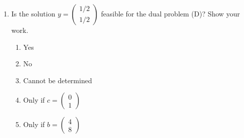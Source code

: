 \documentclass{article}%
\begin{document}
\begin{enumerate}
\begin{enumerate}
\vspace{0.5em}%
\item Is the solution $y = \begin{pmatrix} 1/2 \\ 1/2 \end{pmatrix}$ feasible for the dual problem (D)? Show your work.%
\begin{enumerate}%
\item Yes%
\item No%
\item Cannot be determined%
\item Only if $c = \begin{pmatrix} 0 \\ 1 \end{pmatrix}$%
\item Only if $b = \begin{pmatrix} 4 \\ 8 \end{pmatrix}$%
\end{enumerate}%
\vspace{0.5em}%
\end{enumerate}%
\end{enumerate}

%
\newpage%
\end{document}
